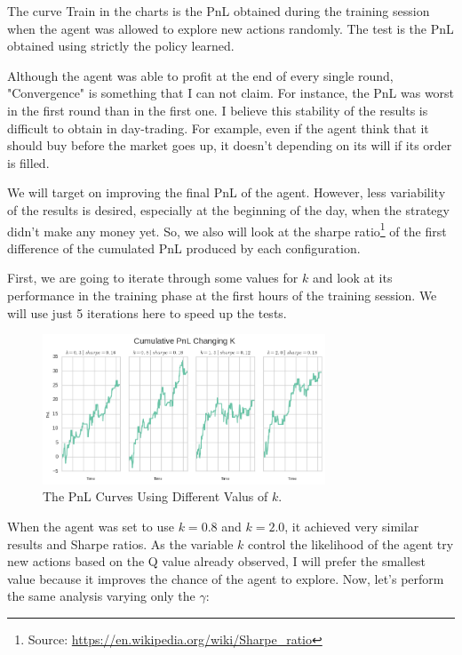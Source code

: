 \documentclass[a4paper]{article}
\begin{document}
The curve Train in the charts is the PnL obtained during the training session when the agent was allowed to explore new actions randomly. The test is the PnL obtained using strictly the policy learned.

Although the agent was able to profit at the end of every single round,  "Convergence" is something that I can not claim. For instance, the PnL was worst in the first round than in the first one. I believe this stability of the results is difficult to obtain in day-trading. For example, even if the agent think that it should buy before the market goes up, it doesn't depending on its will if its order is filled.

We will target on improving the final PnL of the agent. However, less variability of the results is desired, especially at the beginning of the day, when the strategy didn't make any money yet. So, we also will look at the sharpe ratio\footnote{Source: \url{https://en.wikipedia.org/wiki/Sharpe_ratio}} of the first difference of the cumulated PnL produced by each configuration.

First, we are going to iterate through some values for $k$ and look at its performance in the training phase at the first hours of the training session. We will use just 5 iterations here to speed up the tests.

\begin{figure}[ht]
\centering
\includegraphics[width=0.75\textwidth]{figures/optimize_k.png}
\caption{\label{fig:olicy_test_1}The PnL Curves Using Different Valus of $k$.}
\end{figure}

When the agent was set to use $k=0.8$ and $k=2.0$, it achieved very similar results and Sharpe ratios. As the variable $k$ control the likelihood of the agent try new actions based on the Q value already observed, I will prefer the smallest value because it improves the chance of the agent to explore. Now, let's perform the same analysis varying only the $\gamma$:
\end{document}
